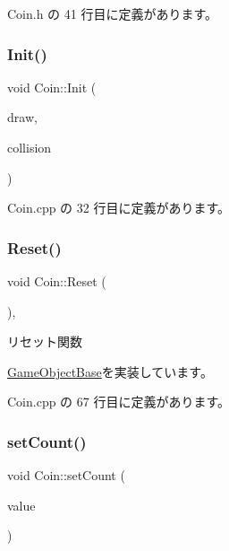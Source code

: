  Coin.\+h の 41 行目に定義があります。

\mbox{\label{class_coin_aecb007762f15ecc91cd6a699e60c2e19}} 
\subsubsection{\texorpdfstring{Init()}{Init()}}
{\footnotesize\ttfamily void Coin\+::\+Init (\begin{DoxyParamCaption}\item[{\mbox{\hyperlink{class_draw_base}{Draw\+Base}} $\ast$}]{draw,  }\item[{\mbox{\hyperlink{class_collision_base}{Collision\+Base}} $\ast$}]{collision }\end{DoxyParamCaption})}



 Coin.\+cpp の 32 行目に定義があります。

\mbox{\label{class_coin_a52c50229ce7c1e0f459e198adac70c8d}} 
\subsubsection{\texorpdfstring{Reset()}{Reset()}}
{\footnotesize\ttfamily void Coin\+::\+Reset (\begin{DoxyParamCaption}{ }\end{DoxyParamCaption})\hspace{0.3cm}{\ttfamily [override]}, {\ttfamily [virtual]}}



リセット関数 



\mbox{\hyperlink{class_game_object_base_a85c59554f734bcb09f1a1e18d9517dce}{Game\+Object\+Base}}を実装しています。



 Coin.\+cpp の 67 行目に定義があります。

\mbox{\label{class_coin_acb3027a1a45470723b7952c73af69878}} 
\subsubsection{\texorpdfstring{set\+Count()}{setCount()}}
{\footnotesize\ttfamily void Coin\+::set\+Count (\begin{DoxyParamCaption}\item[{int}]{value }\end{DoxyParamCaption})\hspace{0.3cm}{\ttfamily [inline]}}



